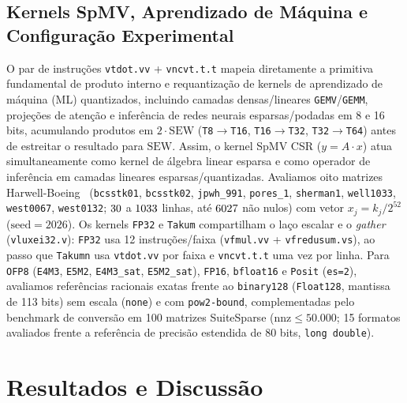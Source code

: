 \documentclass[conference]{IEEEtran}
\begin{document}
\subsection{Kernels SpMV, Aprendizado de M\'aquina e Configura\c{c}\~ao Experimental}
O par de instru\c{c}\~oes \texttt{vtdot.vv} + \texttt{vncvt.t.t} mapeia diretamente a primitiva fundamental de produto interno e requantiza\c{c}\~ao de kernels de aprendizado de m\'aquina (ML) quantizados, incluindo camadas densas/lineares \texttt{GEMV}/\texttt{GEMM}, proje\c{c}\~oes de aten\c{c}\~ao e infer\^encia de redes neurais esparsas/podadas em 8 e 16 bits, acumulando produtos em $2\cdot\mathrm{SEW}$ (\texttt{T8$\to$T16}, \texttt{T16$\to$T32}, \texttt{T32$\to$T64}) antes de estreitar o resultado para $\mathrm{SEW}$. Assim, o kernel SpMV CSR ($y = A\cdot x$) atua simultaneamente como kernel de \'algebra linear esparsa e como operador de infer\^encia em camadas lineares esparsas/quantizadas. Avaliamos oito matrizes Harwell-Boeing~\cite{duff1989hb} (\texttt{bcsstk01}, \texttt{bcsstk02}, \texttt{jpwh\_991}, \texttt{pores\_1}, \texttt{sherman1}, \texttt{well1033}, \texttt{west0067}, \texttt{west0132}; $30$ a $1033$ linhas, at\'e $6027$ n\~ao nulos) com vetor $x_j = k_j/2^{52}$ ($\text{seed}=2026$). Os kernels \texttt{FP32} e \texttt{Takum} compartilham o la\c{c}o escalar e o \emph{gather} (\texttt{vluxei32.v}): \texttt{FP32} usa 12 instru\c{c}\~oes/faixa (\texttt{vfmul.vv} + \texttt{vfredusum.vs}), ao passo que \texttt{Takumn} usa \texttt{vtdot.vv} por faixa e \texttt{vncvt.t.t} uma vez por linha. Para \texttt{OFP8} (\texttt{E4M3}, \texttt{E5M2}, \texttt{E4M3\_sat}, \texttt{E5M2\_sat}), \texttt{FP16}, \texttt{bfloat16} e \texttt{Posit} (\texttt{es=2}), avaliamos refer\^encias racionais exatas frente ao \texttt{binary128} (\texttt{Float128}, mantissa de 113 bits) sem escala (\texttt{none}) e com \texttt{pow2-bound}, complementadas pelo benchmark de convers\~ao em 100 matrizes SuiteSparse ($\mathrm{nnz}\le 50.000$; 15 formatos avaliados frente a refer\^encia de precis\~ao estendida de 80 bits, \texttt{long double}).

\section{Resultados e Discuss\~ao}



\end{document}
